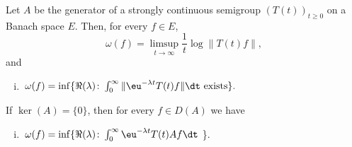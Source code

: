 \begin{theorem}\label{thm:a4-1.3}
Let $A$ be the generator of a strongly continuous semigroup $ (T(t))_{t \geq 0} $ on a Banach space $E$. 
Then, for every $f \in E$,
\begin{equation}\label{eq:a4-1.2}
\omega(f) = \limsup_{t \to \infty} \frac{1}{t}\log\|T(t)f\|, 
\end{equation}
and
\begin{enumerate}[(i)]
\item 
$\,\omega(f) = \inf\{\Re(\lambda)\colon\int_{0}^{\infty} \|\eu^{-\lambda t} T(t)f\|  \dt \text{ exists}\}.$
\end{enumerate}
If\/ $\ker(A) = \{0\}$, then for every $f \in D(A)$ we have
\begin{enumerate}[(i), resume]
\item 
$\,\omega(f) = \inf\{\Re(\lambda)\colon\int_{0}^{\infty} \eu^{-\lambda t} T(t)Af  \dt$
\}.
\end{enumerate}
\end{theorem}
